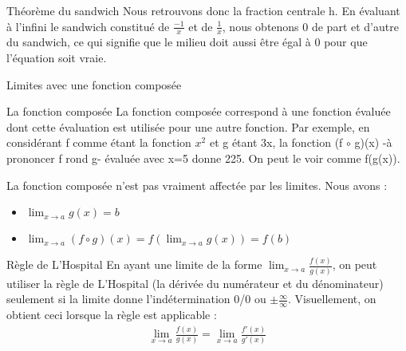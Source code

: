 \documentclass[10pt, french]{article}
\begin{document}
\begin{multicols*}{2}
\begin{rappel}{Théorème du sandwich}
Nous retrouvons donc la fraction centrale h. En évaluant à l'infini le sandwich constitué de $\frac{-1}{x}$ et de $\frac{1}{x}$, nous obtenons 0 de part et d'autre du sandwich, ce qui signifie que le milieu doit aussi être égal à 0 pour que l'équation soit vraie.
\end{rappel}

\begin{rappel}{Limites avec une fonction composée}
  \begin{rappel}{La fonction composée}
  La fonction composée correspond à une fonction évaluée dont cette évaluation est utilisée pour une autre fonction. Par exemple, en considérant f comme étant la fonction $x^{2}$ et g étant 3x, la fonction (f $\circ$ g)(x) -à prononcer f rond g- évaluée avec x=5 donne 225. On peut le voir comme f(g(x)).
  \end{rappel}
  La fonction composée n'est pas vraiment affectée par les limites. Nous avons :
  \begin{itemize}
    \item $\lim_{x \to a}  g(x) = b$ 
    \item $\lim_{x \to a}  (f \circ g) (x) = f(\lim_{x \to a}  g(x)) = f(b)$
  \end{itemize}
\end{rappel}

\begin{rappel}{Règle de L'Hospital}
En ayant une limite de la forme $\lim_{x \to a}  \frac{f(x)}{g(x)}$, on peut utiliser la règle de L'Hospital (la dérivée du numérateur et du dénominateur) seulement si la limite donne l'indétermination 0/0 ou $\pm \frac{\infty}{\infty}$. Visuellement, on obtient ceci lorsque la règle est applicable :
  \begin{align*}
    \lim_{x \to a}  \frac{f(x)}{g(x)}=\lim_{x \to a}  \frac{f'(x)}{g'(x)}
  \end{align*}
\end{rappel}


\end{multicols*}
\end{document}
